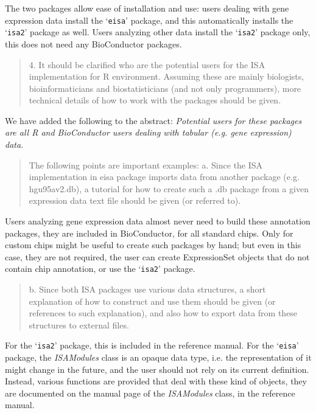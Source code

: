 \documentclass[a4paper]{article}
\newcommand{\Rpackage}[1]{`\texttt{#1}'}
\newcommand{\Rclass}[1]{\textsl{#1}}
\newenvironment{myquote}{\begin{quote}\color{blue}}{\end{quote}}
\begin{document}
The two packages allow ease of installation and use: users dealing
with gene expression data install the \Rpackage{eisa} package, and
this automatically installs the \Rpackage{isa2} package as well. Users
analyzing other data install the \Rpackage{isa2} package only, this
does not need any BioConductor packages.


\begin{myquote}
4.      It should be clarified who are the potential users for the ISA
implementation for R environment. Assuming these are mainly
biologists, bioinformaticians and biostatisticians (and not only
programmers), more technical details of how to work with the packages
should be given.
\end{myquote}

We have added the following to the abstract:
\textsl{
Potential users for these packages are all R and
BioConductor users dealing with tabular (e.g. gene expression) data.
}

\begin{myquote}
The following points are important examples: 
a.      Since the ISA implementation in eisa package imports data from
another package (e.g. hgu95av2.db), a tutorial for how to create such
a .db package from a given expression data text file should be given
(or referred to). 
\end{myquote}

Users analyzing gene expression data almost never need to build
these annotation packages, they are included in BioConductor, for all
standard chips. Only for custom chips might be useful to create such
packages by hand; but even in this case, they are not required, the
user can create ExpressionSet objects that do not contain chip
annotation, or use the \Rpackage{isa2} package.

\begin{myquote}
b.      Since both ISA packages use various data structures, a short
explanation of how to construct and use them should be given (or
references to such explanation), and also how to export data from
these structures to external files. 
\end{myquote}

For the \Rpackage{isa2} package, this is included in the reference
manual. For the \Rpackage{eisa} package, the \Rclass{ISAModules} class
is an opaque data type, i.e. the representation of it might change in the
future, and the user should not rely on its current
definition. Instead, various functions are provided that deal with
these kind of objects, they are documented on the manual page of the
\Rclass{ISAModules} class, in the reference manual.
\end{document}
